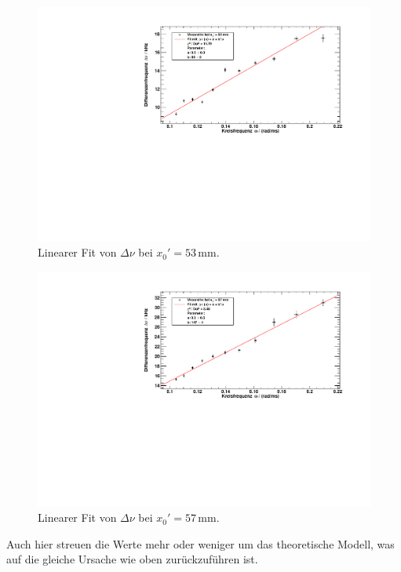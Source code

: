 \begin{figure}[H]
\begin{center}
  \includegraphics[width=\textwidth]{../img/fit_x0_53mm.pdf}
  \caption{Linearer Fit von $\Delta \nu$ bei $x_0' = 53$\,mm.}
  \label{img:fit:T:53mm}
\end{center}
\end{figure}

\begin{figure}[H]
\begin{center}
  \includegraphics[width=\textwidth]{../img/fit_x0_57mm.pdf}
  \caption{Linearer Fit von $\Delta \nu$ bei $x_0' = 57$\,mm.}
  \label{img:fit:T:57mm}
\end{center}
\end{figure}

Auch hier streuen die Werte mehr oder weniger um das theoretische Modell, was auf die gleiche Ursache wie oben zurückzuführen ist.

